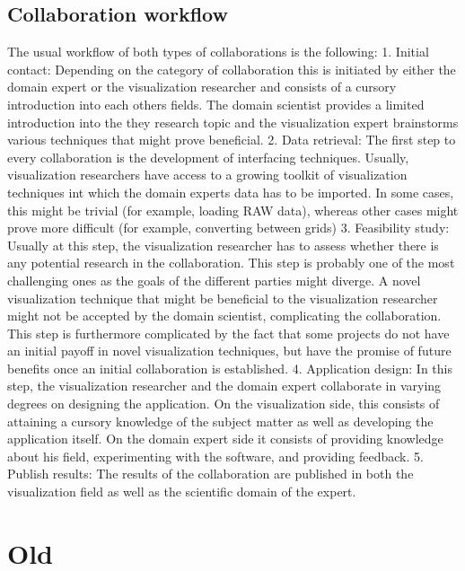 \subsection*{Collaboration workflow}
The usual workflow of both types of collaborations is the following:
1. Initial contact: Depending on the category of collaboration this is initiated by either the domain expert or the visualization researcher and consists of a cursory introduction into each others fields. The domain scientist provides a limited introduction into the they research topic and the visualization expert brainstorms various techniques that might prove beneficial.
2. Data retrieval: The first step to every collaboration is the development of interfacing techniques. Usually, visualization researchers have access to a growing toolkit of visualization techniques int which the domain experts data has to be imported. In some cases, this might be trivial (for example, loading RAW data), whereas other cases might prove more difficult (for example, converting between grids)
3. Feasibility study: Usually at this step, the visualization researcher has to assess whether there is any potential research in the collaboration. This step is probably one of the most challenging ones as the goals of the different parties might diverge. A novel visualization technique that might be beneficial to the visualization researcher might not be accepted by the domain scientist, complicating the collaboration. This step is furthermore complicated by the fact that some projects do not have an initial payoff in novel visualization techniques, but have the promise of future benefits once an initial collaboration is established. 
4. Application design: In this step, the visualization researcher and the domain expert collaborate in varying degrees on designing the application. On the visualization side, this consists of attaining a cursory knowledge of the subject matter as well as developing the application itself. On the domain expert side it consists of providing knowledge about his field, experimenting with the software, and providing feedback.
5. Publish results: The results of the collaboration are published in both the visualization field as well as the scientific domain of the expert.

\section*{Old}


